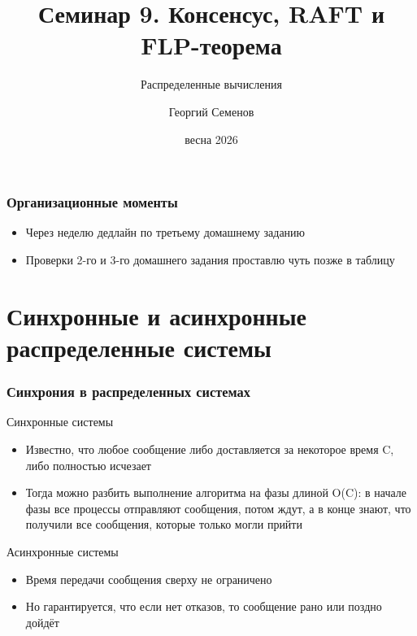 \documentclass{beamer}
\title{Семинар 9. Консенсус, RAFT и FLP-теорема}
\subtitle{Распределенные вычисления}
\author{Георгий Семенов}
\institute{Институт прикладных компьютерных наук \\ Университет ИТМО}
\date{весна 2026}
\newenvironment{definitionbox}[1][Определение]{%
  \begin{exampleblock}{#1}
}{%
  \end{exampleblock}
}
\begin{document}
\frame{\titlepage}

\begin{frame}
\frametitle{Организационные моменты}

\begin{itemize}
  \item Через неделю дедлайн по третьему домашнему заданию
  \item Проверки 2-го и 3-го домашнего задания проставлю чуть позже в таблицу
\end{itemize}

\end{frame}

\section{Синхронные и асинхронные распределенные системы}

\begin{frame}
\frametitle{Синхрония в распределенных системах}

\begin{definitionbox}[Синхронные системы]
  \begin{itemize}
    \item Известно, что любое сообщение либо доставляется за некоторое время C, либо полностью исчезает
    \item Тогда можно разбить выполнение алгоритма на фазы длиной O(C): в начале фазы все процессы отправляют сообщения, потом ждут, а в конце знают, что получили все сообщения, которые только могли прийти
  \end{itemize}
\end{definitionbox}

\begin{definitionbox}[Асинхронные системы]
  \begin{itemize}
    \item Время передачи сообщения сверху не ограничено
    \item Но гарантируется, что если нет отказов, то сообщение рано или поздно дойдёт
  \end{itemize}
\end{definitionbox}

\end{frame}
\end{document}
